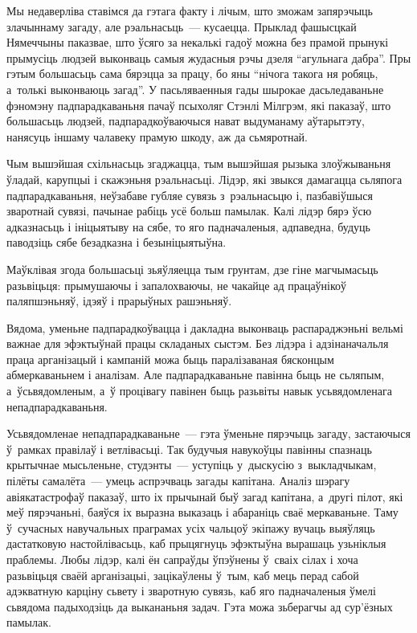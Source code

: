 Мы недаверліва ставімся да гэтага факту і лічым, што зможам запярэчыць злачыннаму загаду, але рэальнасьць~--- кусаецца. Прыклад фашысцкай Нямеччыны паказвае, што ўсяго за некалькі гадоў можна без прамой прынукі прымусіць людзей выконваць самыя жудасныя рэчы дзеля ``агульнага дабра''. Пры гэтым большасьць сама бярэцца за працу, бо яны ``нічога такога ня робяць, а~толькі выконваюць загад''. У пасьляваенныя гады шырокае дасьледаваньне фэномэну падпарадкаваньня пачаў псыхоляг Стэнлі Мілгрэм, які паказаў, што большасьць людзей, падпарадкоўваючыся нават выдуманаму аўтарытэту, нанясуць іншаму чалавеку прамую шкоду, аж да сьмяротнай.

Чым вышэйшая схільнасьць згаджацца, тым вышэйшая рызыка злоўжываньня ўладай, карупцыі і скажэньня рэальнасьці. Лідэр, які звыкся дамагацца сьляпога падпарадкаваньня, неўзабаве губляе сувязь з~рэальнасьцю і, пазбавіўшыся зваротнай сувязі, пачынае рабіць усё больш памылак. Калі лідэр бярэ ўсю адказнасьць і ініцыятыву на сябе, то яго падначаленыя, адпаведна, будуць паводзіць сябе безадказна і безыніцыятыўна. 

Маўклівая згода большасьці зьяўляецца тым грунтам, дзе гіне магчымасьць разьвіцьця: прымушаючы і запалохваючы, не чакайце ад працаўнікоў паляпшэньняў, ідэяў і прарыўных рашэньняў.

Вядома, уменьне падпарадкоўвацца і дакладна выконваць распараджэньні вельмі важнае для эфэктыўнай працы складаных сыстэм. Без лідэра і адзінаначальля праца арганізацый і кампаній можа быць паралізаваная бясконцым абмеркаваньнем і аналізам. Але падпарадкаваньне павінна быць не сьляпым, а~ўсьвядомленым, а~ў процівагу павінен быць разьвіты навык усьвядомленага непадпарадкаваньня. 

Усьвядомленае непадпарадкаваньне~--- гэта ўменьне пярэчыць загаду, застаючыся ў~рамках правілаў і ветлівасьці. Так будучыя навукоўцы павінны спазнаць крытычнае мысьленьне, студэнты~--- уступіць у~дыскусію з~выкладчыкам, пілёты самалёта~--- умець аспрэчваць загады капітана. Аналіз шэрагу авіякатастрофаў паказаў, што іх прычынай быў загад капітана, а~другі пілот, які меў пярэчаньні, баяўся іх выразна выказаць і абараніць сваё меркаваньне. Таму ў~сучасных навучальных праграмах усіх чальцоў экіпажу вучаць выяўляць дастатковую настойлівасьць, каб прыцягнуць эфэктыўна вырашаць узьніклыя праблемы. Любы лідэр, калі ён сапраўды ўпэўнены ў~сваіх сілах і хоча разьвіцьця сваёй арганізацыі, зацікаўлены ў~тым, каб мець перад сабой адэкватную карціну сьвету і зваротную сувязь, каб яго падначаленыя ўмелі сьвядома падыходзіць да выкананьня задач. Гэта можа зьберагчы ад сур'ёзных памылак.

